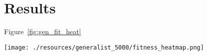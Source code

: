 \section{Results}
    Figure~\ref{fig:gen_fit_heat}

    \begin{figure*}[ht]
        \centering
        \texttt{[image: ./resources/generalist\_5000/fitness\_heatmap.png]}
        \caption{Fitness heatmap from generalist MC-pair evolved over 5000 generations}
        \label{fig:gen_fit_heat}
    \end{figure*}